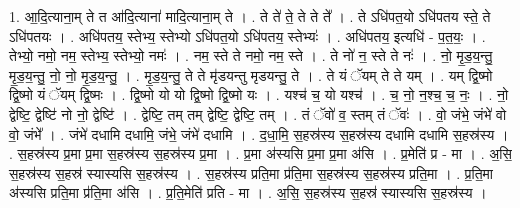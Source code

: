 \documentclass[17pt]{extarticle}
\begin{document}
1. आ॒दि॒त्याना॒म् ते त आ॑दि॒त्याना॑ मादि॒त्याना॒म् ते । . ते ते॑ ते॒ ते ते ते᳚ । . ते ऽधि॑पत॒यो ऽधि॑पतय स्ते॒ ते ऽधि॑पतयः । . अधि॑पतय॒ स्तेभ्य॒ स्तेभ्यो ऽधि॑पत॒यो ऽधि॑पतय॒ स्तेभ्यः॑ । . अधि॑पतय॒ इत्यधि॑ - प॒त॒यः॒ । . तेभ्यो॒ नमो॒ नम॒ स्तेभ्य॒ स्तेभ्यो॒ नमः॑ । . नम॒ स्ते ते नमो॒ नम॒ स्ते । . ते नो॑ न॒ स्ते ते नः॑ । . नो॒ मृ॒ड॒य॒न्तु॒ मृ॒ड॒य॒न्तु॒ नो॒ नो॒ मृ॒ड॒य॒न्तु॒ । . मृ॒ड॒य॒न्तु॒ ते ते मृ॑डयन्तु मृडयन्तु॒ ते । . ते यं ॅयम् ते ते यम् । . यम् द्वि॒ष्मो द्वि॒ष्मो यं ॅयम् द्वि॒ष्मः । . द्वि॒ष्मो यो यो द्वि॒ष्मो द्वि॒ष्मो यः । . यश्च॑ च॒ यो यश्च॑ । . च॒ नो॒ न॒श्च॒ च॒ नः॒ । . नो॒ द्वेष्टि॒ द्वेष्टि॑ नो नो॒ द्वेष्टि॑ । . द्वेष्टि॒ तम् तम् द्वेष्टि॒ द्वेष्टि॒ तम् । . तं ॅवो॑ व॒ स्तम् तं ॅवः॑ । . वो॒ जंभे॒ जंभे॑ वो वो॒ जंभे᳚ । . जंभे॑ दधामि दधामि॒ जंभे॒ जंभे॑ दधामि । . द॒धा॒मि॒ स॒हस्र॑स्य स॒हस्र॑स्य दधामि दधामि स॒हस्र॑स्य । . स॒हस्र॑स्य प्र॒मा प्र॒मा स॒हस्र॑स्य स॒हस्र॑स्य प्र॒मा । . प्र॒मा अ॑स्यसि प्र॒मा प्र॒मा अ॑सि । . प्र॒मेति॑ प्र - मा । . अ॒सि॒ स॒हस्र॑स्य स॒हस्र॑ स्यास्यसि स॒हस्र॑स्य । . स॒हस्र॑स्य प्रति॒मा प्र॑ति॒मा स॒हस्र॑स्य स॒हस्र॑स्य प्रति॒मा । . प्र॒ति॒मा अ॑स्यसि प्रति॒मा प्र॑ति॒मा अ॑सि । . प्र॒ति॒मेति॑ प्रति - मा । . अ॒सि॒ स॒हस्र॑स्य स॒हस्र॑ स्यास्यसि स॒हस्र॑स्य । \newline
\end{document}
